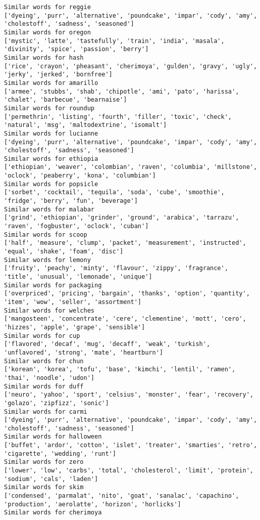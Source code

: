 \documentclass[11pt]{article}
\begin{document}
\begin{Verbatim}[commandchars=\\\{\}]
Similar words for reggie
['dyeing', 'purr', 'alternative', 'poundcake', 'impar', 'cody', 'amy', 'cholestoff', 'sadness', 'seasoned']
Similar words for oregon
['mystic', 'latte', 'tastefully', 'train', 'india', 'masala', 'divinity', 'spice', 'passion', 'berry']
Similar words for hash
['rice', 'crayon', 'pheasant', 'cherimoya', 'gulden', 'gravy', 'ugly', 'jerky', 'jerked', 'bornfree']
Similar words for amarillo
['armee', 'stubbs', 'shab', 'chipotle', 'ami', 'pato', 'harissa', 'chalet', 'barbecue', 'bearnaise']
Similar words for roundup
['permethrin', 'listing', 'fourth', 'filler', 'toxic', 'check', 'natural', 'msg', 'maltodextrine', 'isomalt']
Similar words for lucianne
['dyeing', 'purr', 'alternative', 'poundcake', 'impar', 'cody', 'amy', 'cholestoff', 'sadness', 'seasoned']
Similar words for ethiopia
['ethiopian', 'weaver', 'colombian', 'raven', 'columbia', 'millstone', 'oclock', 'peaberry', 'kona', 'columbian']
Similar words for popsicle
['sorbet', 'cocktail', 'tequila', 'soda', 'cube', 'smoothie', 'fridge', 'berry', 'fun', 'beverage']
Similar words for malabar
['grind', 'ethiopian', 'grinder', 'ground', 'arabica', 'tarrazu', 'raven', 'fogbuster', 'oclock', 'cuban']
Similar words for scoop
['half', 'measure', 'clump', 'packet', 'measurement', 'instructed', 'equal', 'shake', 'foam', 'disc']
Similar words for lemony
['fruity', 'peachy', 'minty', 'flavour', 'zippy', 'fragrance', 'title', 'unusual', 'lemonade', 'unique']
Similar words for packaging
['overpriced', 'pricing', 'bargain', 'thanks', 'option', 'quantity', 'item', 'wow', 'seller', 'assortment']
Similar words for welches
['mangosteen', 'concentrate', 'cere', 'clementine', 'mott', 'cero', 'hizzes', 'apple', 'grape', 'sensible']
Similar words for cup
['flavored', 'decaf', 'mug', 'decaff', 'weak', 'turkish', 'unflavored', 'strong', 'mate', 'heartburn']
Similar words for chun
['korean', 'korea', 'tofu', 'base', 'kimchi', 'lentil', 'ramen', 'thai', 'noodle', 'udon']
Similar words for duff
['neuro', 'yahoo', 'sport', 'celsius', 'monster', 'fear', 'recovery', 'golazo', 'zipfizz', 'sonic']
Similar words for carmi
['dyeing', 'purr', 'alternative', 'poundcake', 'impar', 'cody', 'amy', 'cholestoff', 'sadness', 'seasoned']
Similar words for halloween
['buffet', 'ardor', 'cotton', 'islet', 'treater', 'smarties', 'retro', 'cigarette', 'wedding', 'runt']
Similar words for zero
['lower', 'low', 'carbs', 'total', 'cholesterol', 'limit', 'protein', 'sodium', 'cals', 'laden']
Similar words for skim
['condensed', 'parmalat', 'nito', 'goat', 'sanalac', 'capachino', 'production', 'aerolatte', 'horizon', 'horlicks']
Similar words for cherimoya

\end{Verbatim}
\end{document}
